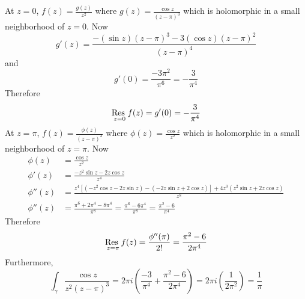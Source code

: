 \documentclass[12pt]{article}
\begin{document}
\begin{itemize}
 At $z = 0$, $f(z) = \frac{g(z)}{z^2}$ where $g(z) = \frac{\cos z}{(z-\pi)^3}$ which is holomorphic in a small neighborhood of $z=0$. Now $$ g'(z) = \frac{-(\sin z)(z-\pi)^3 - 3(\cos z)(z-\pi)^2}{(z-\pi)^4} $$ and $$ g'(0) = \frac{-3\pi^2}{\pi^6} = -\frac{3}{\pi^4} $$ Therefore $$ \underset{z=0}{\text{Res }} f(z) = g'(0) = -\frac{3}{\pi^4} $$ 
 At $z = \pi$, $f(z) = \frac{\phi(z)}{(z-\pi)^3}$ where $\phi(z) = \frac{\cos z}{z^2}$ which is holomorphic in a small neighborhood of $z=\pi$. Now $$ \begin{aligned} \phi(z) &= \frac{\cos z}{z^2} \\ \phi'(z) &= \frac{-z^2\sin z - 2z\cos z}{z^4} \\ \phi''(z) &= \frac{z^4[( -z^2 \cos z - 2z\sin z) - (-2z\sin z + 2\cos z)] + 4z^3(z^2\sin z + 2z\cos z)}{z^8} \\ \phi''(z) &= \frac{\pi^6 + 2\pi ^4 - 8\pi^4}{\pi^8} = \frac{\pi^6 - 6\pi^4}{\pi^8} = \frac{\pi^2 - 6}{\pi^4} \end{aligned} $$ 
 Therefore $$ \underset{z=\pi}{\text{Res }} f(z) = \frac{\phi''(\pi)}{2!} = \frac{\pi^2 - 6}{2\pi^4} $$ Furthermore, $$ \int_\gamma \frac{\cos z}{z^2(z-\pi)^3} = 2\pi i( \frac{-3}{\pi^4} + \frac{\pi^2 - 6}{2\pi^4}) = 2\pi i (\frac{1}{2\pi^2}) = \frac{1}{\pi} $$ \end{itemize} 
\end{document}
